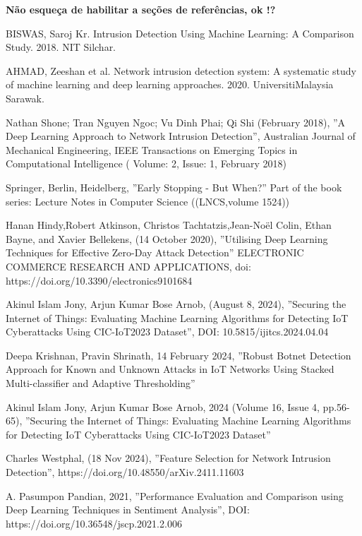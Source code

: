 \documentclass[conference]{IEEEtran}
\begin{document}
\textbf{Não esqueça de habilitar a seções de referências, ok !?}

\begin{thebibliography}{00}


    BISWAS, Saroj Kr. Intrusion Detection Using Machine Learning: A Comparison Study. 2018. NIT Silchar.
    
    AHMAD, Zeeshan et al. Network intrusion detection system: A systematic study of machine learning and deep learning approaches. 2020. UniversitiMalaysia Sarawak.
    
     Nathan Shone; Tran Nguyen Ngoc; Vu Dinh Phai; Qi Shi  (February 2018), ''A Deep Learning Approach to Network Intrusion Detection'', Australian Journal of Mechanical Engineering, IEEE Transactions on Emerging Topics in Computational Intelligence ( Volume: 2, Issue: 1, February 2018)
    
     Springer, Berlin, Heidelberg, ''Early Stopping - But When?'' Part of the book series: Lecture Notes in Computer Science ((LNCS,volume 1524))
    
     Hanan Hindy,Robert Atkinson, Christos Tachtatzis,Jean-Noël Colin, Ethan Bayne, and Xavier Bellekens, (14 October 2020), ''Utilising Deep Learning Techniques for Effective Zero-Day Attack Detection'' ELECTRONIC COMMERCE RESEARCH AND APPLICATIONS, doi: https://doi.org/10.3390/electronics9101684
    
     Akinul Islam Jony, Arjun Kumar Bose Arnob, (August 8, 2024), ''Securing the Internet of Things: Evaluating Machine Learning Algorithms for Detecting IoT Cyberattacks Using CIC-IoT2023 Dataset'', DOI: 10.5815/ijitcs.2024.04.04
    
     Deepa Krishnan, Pravin Shrinath, 14 February 2024, ''Robust Botnet Detection Approach for Known and Unknown Attacks in IoT Networks Using Stacked Multi-classifier and Adaptive Thresholding''
    
     Akinul Islam Jony, Arjun Kumar Bose Arnob, 2024 (Volume 16, Issue 4, pp.56-65), ''Securing the Internet of Things: Evaluating Machine Learning Algorithms for Detecting IoT Cyberattacks Using CIC-IoT2023 Dataset''
    
     Charles Westphal, (18 Nov 2024), ''Feature Selection for Network Intrusion Detection'', https://doi.org/10.48550/arXiv.2411.11603
    
     A. Pasumpon Pandian, 2021, ''Performance Evaluation and Comparison using Deep Learning Techniques in Sentiment Analysis'', DOI: https://doi.org/10.36548/jscp.2021.2.006
    

\end{thebibliography}
\end{document}
